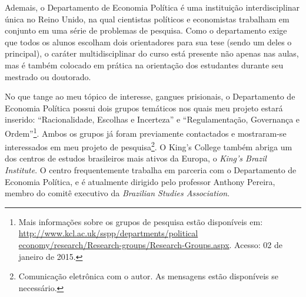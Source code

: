 \documentclass[a4paper,11pt]{article}
\begin{document}
Ademais, o Departamento de Economia Política é uma instituição interdisciplinar única no Reino Unido, na qual cientistas políticos e economistas trabalham em conjunto em uma série de problemas de pesquisa. Como o departamento exige que todos os alunos escolham dois orientadores para sua tese (sendo um deles o principal), o caráter multidisciplinar do curso está presente não apenas nas aulas, mas é também colocado em prática na orientação dos estudantes durante seu mestrado ou doutorado.

No que tange ao meu tópico de interesse, gangues prisionais, o Departamento de Economia Política possui dois grupos temáticos nos quais meu projeto estará inserido: ``Racionalidade, Escolhas e Incerteza'' e ``Regulamentação, Governança e Ordem''\footnote{Mais informações sobre os grupos de pesquisa estão disponíveis em: \href{http://www.kcl.ac.uk/sspp/departments/politicaleconomy/research/Research-groups/Research-Groups.aspx}{http://www.kcl.ac.uk/sspp/departments/political\\economy/research/Research-groups/Research-Groups.aspx}. Acesso: 02 de janeiro de 2015.}. Ambos os grupos já foram previamente contactados e mostraram-se interessados em meu projeto de pesquisa\footnote{Comunicação eletrônica com o autor. As mensagens estão disponíveis se necessário.}. O King's College também abriga um dos centros de estudos brasileiros mais ativos da Europa, o \textit{King's Brazil Institute}. O centro frequentemente trabalha em parceria com o Departamento de Economia Política, e é atualmente dirigido pelo professor Anthony Pereira, membro do comitê executivo da \textit{Brazilian Studies Association}. 
\end{document}
